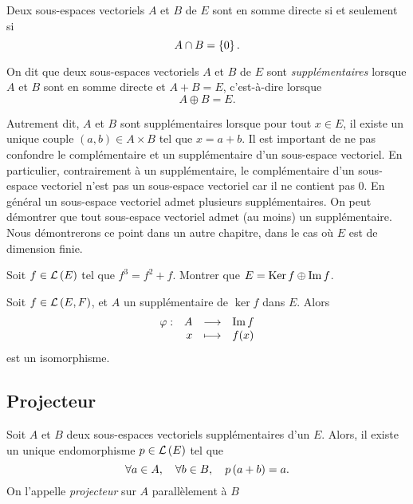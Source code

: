 \documentclass{magnolia}
\begin{document}
\begin{proposition}[utile=3]
Deux sous-espaces vectoriels $A$ et $B$ de $E$ sont en somme directe si
et seulement si
\[A\cap B=\left\{0\right\}.\]
\end{proposition}

\begin{definition}[utile=-3]
On dit que deux sous-espaces vectoriels $A$ et $B$ de $E$ sont \emph{supplémentaires}
lorsque $A$ et $B$ sont en somme directe et $A+B=E$, c'est-à-dire lorsque
\[A\oplus B=E.\]
\end{definition}

\begin{remarques}
\remarque Autrement dit, $A$ et $B$ sont supplémentaires lorsque pour tout $x\in E$, il existe un unique couple
  $(a,b)\in A\times B$ tel que $x=a+b$.
\remarque Il est important de ne pas confondre \og le complémentaire \fg et \og un supplémentaire \fg d'un
  sous-espace vectoriel. En particulier, contrairement à un supplémentaire, le complémentaire d'un sous-espace
  vectoriel n'est pas un sous-espace vectoriel car il ne contient pas 0. 
\remarque En général un sous-espace vectoriel admet plusieurs supplémentaires.
\remarque On peut démontrer que tout sous-espace vectoriel admet (au moins) un supplémentaire. 
  Nous démontrerons ce point dans un autre chapitre, dans le cas où $E$ est de dimension finie.
\end{remarques}


\begin{exoUnique}
\exo Soit $f\in\mathcal{L}\left(E\right)$ tel que $f^3=f^2+f$. Montrer que
  $E=\mathop{\rm Ker} f\oplus\operatorname{Im} f$.
\end{exoUnique}

\begin{proposition}[nom={Version géométrique du théorème du rang}]
Soit $f\in\mathcal{L}\left(E,F\right)$, et $A$ un supplémentaire de $\ker f$ dans $E$. Alors
\[\begin{array}[t]{lrcl} \displaystyle{\varphi} : & \displaystyle{A} & \longrightarrow & \displaystyle{\operatorname{Im}f} \\ & \displaystyle{x} & \longmapsto & \displaystyle{f(x)} \end{array}\]
est un isomorphisme.
\end{proposition}

\subsection{Projecteur}

\begin{definition}[utile=-3]
Soit $A$ et $B$ deux sous-espaces vectoriels supplémentaires d'un \Kev $E$.
Alors, il existe un unique endomorphisme $p\in\mathcal{L}\left(E\right)$ tel que
\[\forall a\in A ,\quad \forall b\in B ,\quad p\left(a+b\right)=a.\]
On l'appelle \emph{projecteur} sur $A$ parallèlement à $B$
\end{definition}
\end{document}
